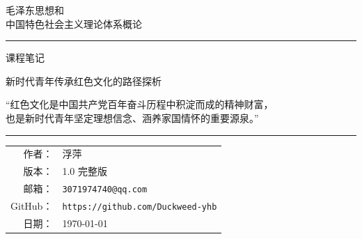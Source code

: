\begin{titlepage}
    \thispagestyle{empty}
    \centering

    \vspace*{1.8cm}

    {\Large \heiti 毛泽东思想和\\[0.3em]
    中国特色社会主义理论体系概论\par}

    \vspace{0.6cm}
    \rule{0.68\textwidth}{0.6pt}
    \vspace{0.7cm}

    {\LARGE \heiti 课程笔记\par}

    \vspace{0.6cm}

    {\large 新时代青年传承红色文化的路径探析\par}

    \vspace{1.4cm}

    \begin{minipage}{0.75\textwidth}
        \centering
        {\small
        “红色文化是中国共产党百年奋斗历程中积淀而成的精神财富，\\
        也是新时代青年坚定理想信念、涵养家国情怀的重要源泉。”\par}
    \end{minipage}

    \vfill

    \rule{0.48\textwidth}{0.5pt}
    \vspace{0.9cm}

    {\normalsize
    \renewcommand{\arraystretch}{1.35}
    \begin{tabular}{rl}
        作者：   & 浮萍 \\
        版本：   & 1.0 完整版 \\
        邮箱：   & \texttt{3071974740@qq.com} \\
        GitHub： & \texttt{https://github.com/Duckweed-yhb} \\
        日期：   & \today \\
    \end{tabular}
    \par}

    \vspace{1.2cm}
\end{titlepage}